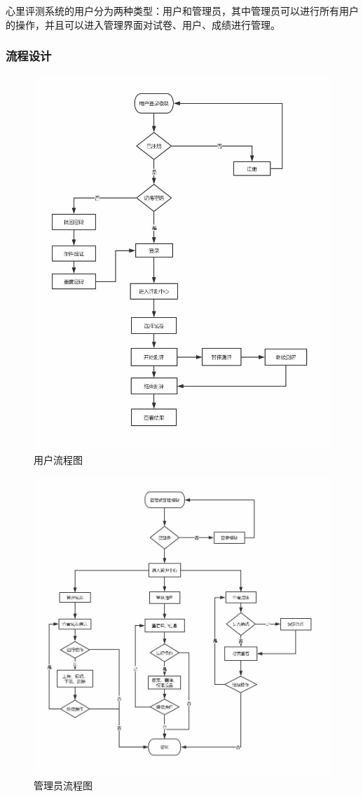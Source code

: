 心里评测系统的用户分为两种类型：用户和管理员，其中管理员可以进行所有用户的操作，并且可以进入管理界面对试卷、用户、成绩进行管理。

\subsubsection{流程设计}

\begin{figure}[thbp!]
	\centering
	\includegraphics[width=0.8\linewidth]{figure/user_use}
	\caption{用户流程图}
	\label{fig:user_use}
\end{figure}

\begin{figure}[thbp!]
	\centering
	\includegraphics[width=1.0\linewidth]{figure/admin_use}
	\caption{管理员流程图}
	\label{fig:admin_use}
\end{figure}

